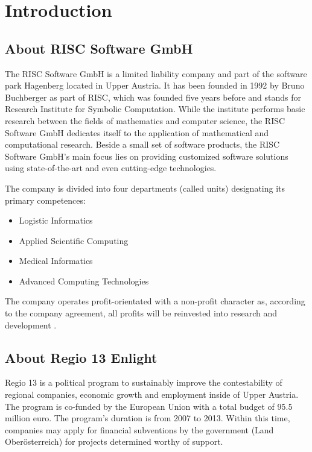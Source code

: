 \section{Introduction}

\subsection{About RISC Software GmbH}

The RISC Software GmbH is a limited liability company and part of the software park Hagenberg located in Upper Austria. It has been founded in 1992 by Bruno Buchberger as part of RISC, which was founded five years before and stands for Research Institute for Symbolic Computation. While the institute performs basic research between the fields of mathematics and computer science, the RISC Software GmbH dedicates itself to the application of mathematical and computational research. Beside a small set of software products, the RISC Software GmbH's main focus lies on providing customized software solutions using state-of-the-art and even cutting-edge technologies.

The company is divided into four departments (called units) designating its primary competences:

\begin{itemize}
	\item Logistic Informatics
	\item Applied Scientific Computing
	\item Medical Informatics
	\item Advanced Computing Technologies
\end{itemize}

The company operates profit-orientated with a non-profit character as, according to the company agreement, all profits will be reinvested into research and development \cite{risc_website}.


\subsection{About Regio 13 Enlight}
\label{sec:about_enlight}

Regio 13 is a political program to sustainably improve the contestability of regional companies, economic growth and employment inside of Upper Austria. The program is co-funded by the European Union with a total budget of 95.5 million euro. The program's duration is from 2007 to 2013. Within this time, companies may apply for financial subventions by the government (Land Oberösterreich) for projects determined worthy of support.

